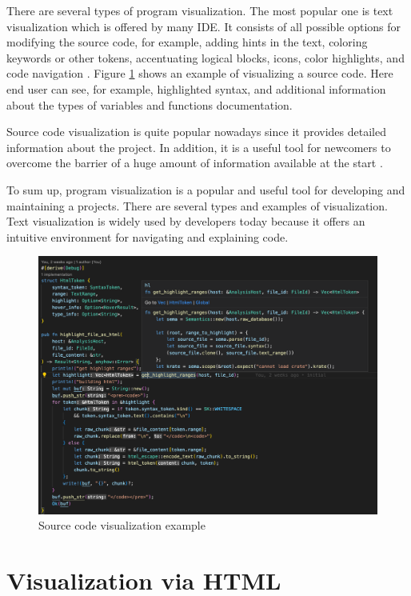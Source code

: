 There are several types of program visualization. The most popular one is text visualization which is offered by many IDE.
It consists of all possible options for modifying the source code, for example, adding hints in the text, coloring keywords or other tokens, accentuating logical blocks, icons, color highlights, and code navigation \cite{2018visual}. 
Figure \ref{fig:hl_example_1} shows an example of visualizing a source code. Here end user can see, for example, highlighted syntax, and additional information about the types of variables and functions documentation.

Source code visualization is quite popular nowadays since it provides detailed information about the project. In addition, it is a useful tool for newcomers to overcome the barrier of a huge amount of information available at the start \cite{5336433}. 

To sum up, program visualization is a popular and useful tool for developing and maintaining a projects. 
There are several types and examples of visualization. Text visualization is widely used by developers today because it offers an intuitive environment for navigating and explaining code.

\begin{figure}[hbt]
\centering
\includegraphics[width=15cm]{figs/hl_example_2.png}
\caption{Source code visualization example}
\label{fig:hl_example_1}
\end{figure}



\section{Visualization via HTML}
\label{sec:html}

